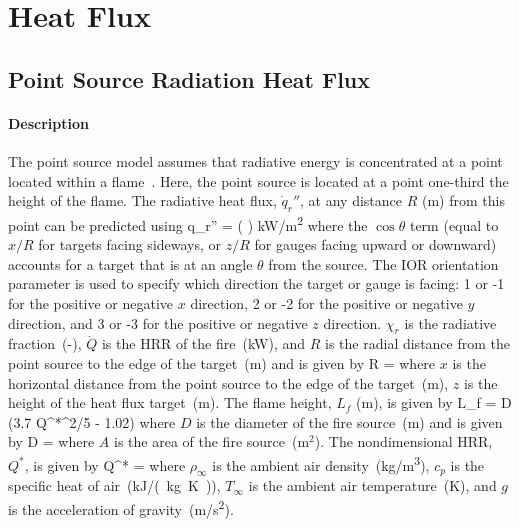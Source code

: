 
\chapter{Heat Flux}
\label{Heat_Flux_Chapter}

\section{Point Source Radiation Heat Flux}

\subsubsection*{Description}

The point source model assumes that radiative energy is concentrated at a point located within a flame~\cite{Beyler2:SFPE}.
Here, the point source is located at a point one-third the height of the flame.
The radiative heat flux, $\dot q_r''$, at any distance $R$ (\si{m}) from this point can be predicted using
\be
\dot q_r'' = \cos\theta \left(  \right) \quad \si{kW/m^2}
\label{eq:point_source}
\ee
where the $\cos\theta$ term (equal to $x/R$ for targets facing sideways, or $z/R$ for gauges facing upward or downward) accounts for a target that is at an angle $\theta$ from the source. The IOR orientation parameter is used to specify which direction the target or gauge is facing: 1 or -1 for the positive or negative $x$ direction, 2 or -2 for the positive or negative $y$ direction, and 3 or -3 for the positive or negative $z$ direction. $\chi_r$ is the radiative fraction~(-), $\dot Q$ is the HRR of the fire~(\si{kW}), and $R$ is the radial distance from the point source to the edge of the target~(\si{m}) and is given by
\be
R = 
\label{eq:point_source_R}
\ee
where $x$ is the horizontal distance from the point source to the edge of the target~(\si{m}), $z$ is the height of the heat flux target~(\si{m}). The flame height, $L_f$ (\si{m}), is given by
\be
L_f = D (3.7 Q^{*^{2/5}} - 1.02)
\label{eq:point_source_Lf}
\ee
where $D$ is the diameter of the fire source~(\si{m}) and is given by
\be
D = 
\label{eq:point_source_D}
\ee
where $A$ is the area of the fire source~(m$^2$). The nondimensional HRR, $Q^*$, is given by
\be
Q^* = 
\label{eq:point_source_Qstar}
\ee
where $\rho_\infty$ is the ambient air density~(\si{kg/m^3}), $c_p$ is the specific heat of air~(\si{kJ/(kg.K)}), $T_\infty$ is the ambient air temperature~(\si{K}), and $g$ is the acceleration of gravity~(\si{m/s^2}).

